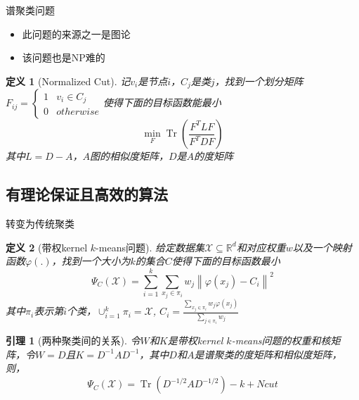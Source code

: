 \documentclass[notheorems]{beamer}
\newcommand{\R}{\mathbb{R}}
\newcommand{\norm}[1]{\left\lVert#1\right\rVert}
\newtheorem{lemma}[theorem]{引理}
\newtheorem{definition}{定义}
\begin{document}
\begin{CJK*}{UTF8}{gbsn}
\begin{frame}{谱聚类问题}
	\begin{itemize}
		\item 此问题的来源之一是图论
		\item 该问题也是NP难的
	\end{itemize}
	\begin{definition}[Normalized Cut]
		记$v_i$是节点$i$，$C_j$是类$j$，找到一个划分矩阵$F_{ij} = \begin{cases} 1 & {v_i \in C_j} \\ 0 & {otherwise}
		\end{cases}$使得下面的目标函数能最小
		\begin{equation}
			\min\limits_{F} \operatorname{Tr}(\frac{F^T L F}{F^T D F})
		\end{equation}
		其中$L = D-A$，$A$图的相似度矩阵，$D$是$A$的度矩阵
	\end{definition}
\end{frame}

\subsection{有理论保证且高效的算法}

\begin{frame}{转变为传统聚类}
	\footnotesize{
		\begin{definition}[带权kernel $k$-means问题]
			给定数据集$\mathcal{X} \subseteq \R^d$和对应权重$w$以及一个映射函数$\varphi(.)$，找到一个大小为$k$的集合$C$使得下面的目标函数最小
			\begin{equation}
			\Psi_C(\mathcal{X}) = \sum_{i=1}^k \sum_{x_j \in \pi_i}w_j \norm{\varphi(x_j)-C_i}^2
			\end{equation}
			其中$\pi_i$表示第$i$个类，$\cup_{i=1}^k \pi_i = \mathcal{X}$, $C_i = \frac{\sum_{x_j \in \pi_i}w_j \varphi(x_j)}{\sum_{j \in \pi_i}w_j}$
		\end{definition}
	}
	\footnotesize{
		\begin{lemma}[两种聚类间的关系]
			令$W$和$K$是带权kernel $k$-means问题的权重和核矩阵，令$W=D$且$K=D^{-1}AD^{-1}$，其中$D$和$A$是谱聚类的度矩阵和相似度矩阵，则，
			\begin{equation}
			\Psi_C(\mathcal{X})=\operatorname{Tr}(D^{-1/2}AD^{-1/2})-k+Ncut
			\end{equation}
		\end{lemma}
	}
	
\end{frame}


\end{CJK*}
\end{document}
